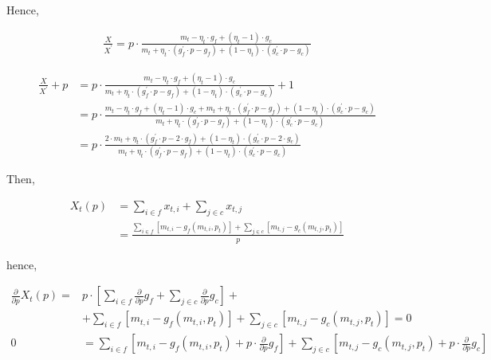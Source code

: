 \documentclass[american]{scrartcl}
\begin{document}
	Hence,

	\begin{equation}
		\begin{split}
			\frac{X}{X^\prime} = p \cdot \frac{m_t - \eta_t \cdot g_f + (\eta_t - 1) \cdot g_c}{m_t + \eta_t \cdot ( g^\prime_f \cdot p - g_f ) + (1 - \eta_t) \cdot (g^\prime_c \cdot p - g_c)}
		\end{split}
	\end{equation}

	\begin{equation}
		\begin{split}
			\frac{X}{X^\prime} + p &= p \cdot \frac{m_t - \eta_t \cdot g_f + (\eta_t - 1) \cdot g_c}{m_t + \eta_t \cdot ( g^\prime_f \cdot p - g_f ) + (1 - \eta_t) \cdot (g^\prime_c \cdot p - g_c)} + 1 \\
			&= p \cdot  \frac{m_t - \eta_t \cdot g_f + (\eta_t - 1) \cdot g_c + m_t + \eta_t \cdot ( g^\prime_f \cdot p - g_f ) + (1 - \eta_t) \cdot (g^\prime_c \cdot p - g_c)}{m_t + \eta_t \cdot ( g^\prime_f \cdot p - g_f ) + (1 - \eta_t) \cdot (g^\prime_c \cdot p - g_c)} \\
			&= p \cdot \frac{2 \cdot m_t + \eta_t \cdot (g^\prime_f \cdot p - 2\cdot g_f) + (1 - \eta_t) \cdot (g^\prime_c \cdot p - 2\cdot g_c)}{m_t + \eta_t \cdot ( g^\prime_f \cdot p - g_f ) + (1 - \eta_t) \cdot (g^\prime_c \cdot p - g_c)}
		\end{split}
	\end{equation}

\fi

\iffalse %
	Then,

	\begin{equation}
		\begin{split}
			X_t(p) &= \sum_{i\in f}  x_{t, i} + \sum_{j \in c} x_{t, j} \\
			&= \frac{\sum_{i \in f}  \left[m_{t, i} - g_f(m_{t, i}, p_t)\right]  + \sum_{j \in c}  \left[m_{t, j} - g_c(m_{t, j}, p_t)\right]}{p}
		\end{split}
	\end{equation}

	hence,

	\begin{equation}
		\begin{split}
			\frac{\partial}{\partial p} X_t(p) = &p \cdot \left[\sum_{i \in f} \frac{\partial}{\partial p} g_f + \sum_{j \in c} \frac{\partial}{\partial p} g_c  \right] + \\
			&+ \sum_{i \in f}  \left[m_{t, i} - g_f(m_{t, i}, p_t)\right]  + \sum_{j \in c}  \left[m_{t, j} - g_c(m_{t, j}, p_t)\right] = 0 \\
			0 &= \sum_{i \in f} \left[ m_{t, i} - g_f(m_{t, i}, p_t) + p \cdot \frac{\partial}{\partial p} g_f \right] + \sum_{j \in c}\left[m_{t, j} - g_c(m_{t, j}, p_t) +  p \cdot\frac{\partial}{\partial p} g_c\right]
		\end{split}
	\end{equation}
\end{document}
